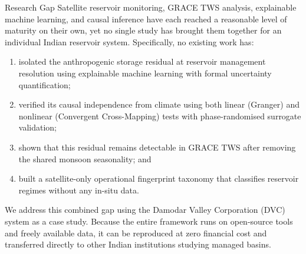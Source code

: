 \documentclass[10pt]{beamer}
\begin{document}
\begin{frame}{Research Gap}
  \small
  Satellite reservoir monitoring, GRACE TWS analysis, explainable machine
  learning, and causal inference have each reached a reasonable level of
  maturity on their own, yet no single study has brought them together for an
  individual Indian reservoir system. Specifically, no existing work has:

  \smallskip
  \begin{enumerate}[label=(\alph*)]\footnotesize
    \item isolated the anthropogenic storage residual at reservoir management
      resolution using explainable machine learning with formal uncertainty
      quantification;
    \item verified its causal independence from climate using both linear
      (Granger) and nonlinear (Convergent Cross-Mapping) tests with
      phase-randomised surrogate validation;
    \item shown that this residual remains detectable in GRACE TWS after
      removing the shared monsoon seasonality; and
    \item built a satellite-only operational fingerprint taxonomy that
      classifies reservoir regimes without any in-situ data.
  \end{enumerate}

  \smallskip
  \small
  We address this combined gap using the Damodar Valley Corporation (DVC)
  system as a case study. Because the entire framework runs on open-source
  tools and freely available data, it can be reproduced at zero financial
  cost and transferred directly to other Indian institutions studying managed
  basins.
\end{frame}
\end{document}
